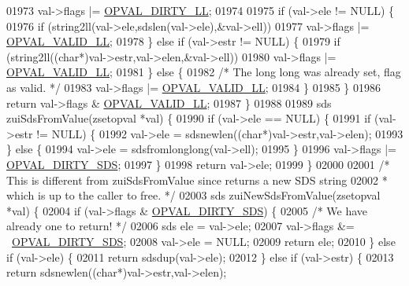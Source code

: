 \begin{DoxyCode}
01973         val->flags |= \hyperlink{t__zset_8c_a9999cca84f897ad3930ec05f5fbd4c6a}{OPVAL\_DIRTY\_LL};
01974 
01975         \textcolor{keywordflow}{if} (val->ele != NULL) \{
01976             \textcolor{keywordflow}{if} (string2ll(val->ele,sdslen(val->ele),&val->ell))
01977                 val->flags |= \hyperlink{t__zset_8c_ad167719b3971be74b94f0233de011e67}{OPVAL\_VALID\_LL};
01978         \} \textcolor{keywordflow}{else} \textcolor{keywordflow}{if} (val->estr != NULL) \{
01979             \textcolor{keywordflow}{if} (string2ll((\textcolor{keywordtype}{char}*)val->estr,val->elen,&val->ell))
01980                 val->flags |= \hyperlink{t__zset_8c_ad167719b3971be74b94f0233de011e67}{OPVAL\_VALID\_LL};
01981         \} \textcolor{keywordflow}{else} \{
01982             \textcolor{comment}{/* The long long was already set, flag as valid. */}
01983             val->flags |= \hyperlink{t__zset_8c_ad167719b3971be74b94f0233de011e67}{OPVAL\_VALID\_LL};
01984         \}
01985     \}
01986     \textcolor{keywordflow}{return} val->flags & \hyperlink{t__zset_8c_ad167719b3971be74b94f0233de011e67}{OPVAL\_VALID\_LL};
01987 \}
01988 
01989 sds zuiSdsFromValue(zsetopval *val) \{
01990     \textcolor{keywordflow}{if} (val->ele == NULL) \{
01991         \textcolor{keywordflow}{if} (val->estr != NULL) \{
01992             val->ele = sdsnewlen((\textcolor{keywordtype}{char}*)val->estr,val->elen);
01993         \} \textcolor{keywordflow}{else} \{
01994             val->ele = sdsfromlonglong(val->ell);
01995         \}
01996         val->flags |= \hyperlink{t__zset_8c_acbe2b593dce5dd6c6d7219e6be208e5f}{OPVAL\_DIRTY\_SDS};
01997     \}
01998     \textcolor{keywordflow}{return} val->ele;
01999 \}
02000 
02001 \textcolor{comment}{/* This is different from zuiSdsFromValue since returns a new SDS string}
02002 \textcolor{comment}{ * which is up to the caller to free. */}
02003 sds zuiNewSdsFromValue(zsetopval *val) \{
02004     \textcolor{keywordflow}{if} (val->flags & \hyperlink{t__zset_8c_acbe2b593dce5dd6c6d7219e6be208e5f}{OPVAL\_DIRTY\_SDS}) \{
02005         \textcolor{comment}{/* We have already one to return! */}
02006         sds ele = val->ele;
02007         val->flags &= ~\hyperlink{t__zset_8c_acbe2b593dce5dd6c6d7219e6be208e5f}{OPVAL\_DIRTY\_SDS};
02008         val->ele = NULL;
02009         \textcolor{keywordflow}{return} ele;
02010     \} \textcolor{keywordflow}{else} \textcolor{keywordflow}{if} (val->ele) \{
02011         \textcolor{keywordflow}{return} sdsdup(val->ele);
02012     \} \textcolor{keywordflow}{else} \textcolor{keywordflow}{if} (val->estr) \{
02013         \textcolor{keywordflow}{return} sdsnewlen((\textcolor{keywordtype}{char}*)val->estr,val->elen);

\end{DoxyCode}
